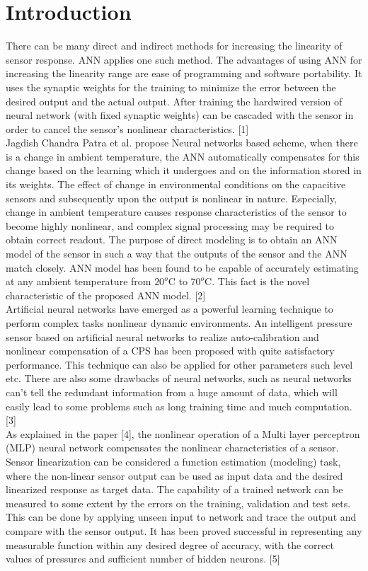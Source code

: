 \documentclass[conference]{IEEEtran}
\begin{document}
\section{Introduction}
There can be many direct and indirect methods for increasing the linearity of sensor response. ANN applies one such method. The advantages of using ANN for increasing the linearity range are ease of programming and software portability. It uses the synaptic weights for the training to minimize the error between the desired output and the actual output. After training the hardwired version of neural network (with fixed synaptic weights) can be cascaded with the sensor in order to cancel the sensor’s nonlinear characteristics. [1]\\
Jagdish Chandra Patra et al. propose Neural networks based scheme, when there is a change in ambient temperature, the ANN automatically compensates for this change based on the learning which it undergoes and on the information stored in its weights. The effect of change in environmental conditions on the capacitive sensors and subsequently upon the output is nonlinear in nature. Especially, change in ambient temperature causes response characteristics of the sensor to become highly nonlinear, and complex signal processing may be required to obtain correct readout. The purpose of direct modeling is to obtain an ANN model of the sensor in such a way that the outputs of the sensor and the ANN match closely. ANN model has been found to be capable of accurately estimating at any ambient temperature from $20^o$C to $70^o$C. This fact is the novel characteristic of the proposed ANN model. [2]\\
Artificial neural networks have emerged as a powerful learning technique to perform complex tasks nonlinear dynamic environments. An intelligent pressure sensor based on artificial neural networks to realize auto-calibration and nonlinear compensation of a CPS has been proposed with quite satisfactory performance. This technique can also be applied for other parameters such level etc. There are also some drawbacks of neural networks, such as neural networks can’t tell the redundant information from a huge amount of data, which will easily lead to some problems such as long training time and much computation. [3]\\
As explained in the paper [4], the nonlinear operation of a Multi layer perceptron (MLP) neural network compensates the nonlinear characteristics of a sensor. Sensor linearization can be considered a function estimation (modeling) task, where the non-linear sensor output can be used as input data and the desired linearized response as target data. 
The capability of a trained network can be measured to some extent by the errors on the training, validation and test sets. This can be done by applying unseen input to network and trace the output and compare with the sensor output. It has been proved successful in representing any measurable function within any desired degree of accuracy, with the correct values of pressures and sufficient number of hidden neurons. [5]
\end{document}
